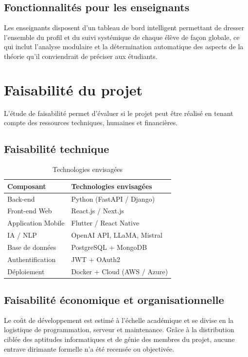 \documentclass[12pt,a4paper]{report}
\begin{document}
\section{Fonctionnalités pour les enseignants}
Les enseignants disposent d'un tableau de bord intelligent permettant de dresser l'ensemble du profil et du suivi systémique de chaque élève de façon globale, ce qui inclut l'analyse modulaire et la détermination automatique des aspects de la théorie qu'il conviendrait de préciser aux étudiants.


\chapter{Faisabilité du projet}
L'étude de faisabilité permet d'évaluer si le projet peut être réalisé en tenant compte des ressources techniques, humaines et financières.

\section{Faisabilité technique}
\begin{table}[H]
\centering
\begin{tabular}{@{}ll@{}}
\toprule
\textbf{Composant} & \textbf{Technologies envisagées} \\ \midrule
Back-end & Python (FastAPI / Django) \\
Front-end Web & React.js / Next.js \\
Application Mobile & Flutter / React Native \\
IA / NLP & OpenAI API, LLaMA, Mistral \\
Base de données & PostgreSQL + MongoDB \\
Authentification & JWT + OAuth2 \\
Déploiement & Docker + Cloud (AWS / Azure) \\ \bottomrule
\end{tabular}
\caption{Technologies envisagées}
\end{table}

\section{Faisabilité économique et organisationnelle}
Le coût de développement est estimé à l'échelle académique et se divise en la logistique de programmation, serveur et maintenance. Grâce à la distribution ciblée des aptitudes informatiques et de génie des membres du projet, aucune entrave dirimante formelle n'a été recensée ou objectivée.
\end{document}
